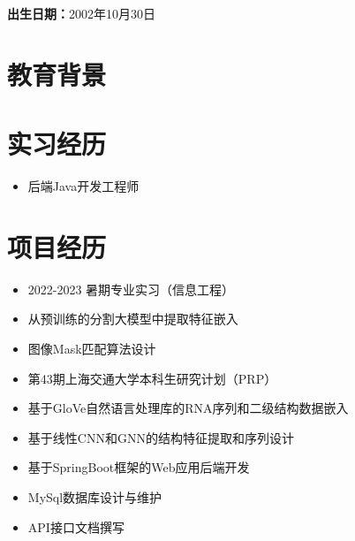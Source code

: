 \documentclass{resume}
\begin{document}

\begin{center}
  \textbf{出生日期：}2002年10月30日
\end{center}

\section{教育背景}


\section{实习经历}

\begin{itemize}[parsep=0.5ex]
  \item 后端Java开发工程师
\end{itemize}
\section{项目经历}

\begin{itemize}[parsep=0.5ex]
  \item 2022-2023 暑期专业实习（信息工程）
  \item 从预训练的分割大模型中提取特征嵌入
  \item 图像Mask匹配算法设计
\end{itemize}

\begin{itemize}[parsep=0.5ex]
  \item 第43期上海交通大学本科生研究计划（PRP）
  \item 基于GloVe自然语言处理库的RNA序列和二级结构数据嵌入
  \item 基于线性CNN和GNN的结构特征提取和序列设计
\end{itemize}

\begin{itemize}[parsep=0.5ex]
  \item 基于SpringBoot框架的Web应用后端开发
  \item MySql数据库设计与维护
  \item API接口文档撰写
\end{itemize}
\end{document}
